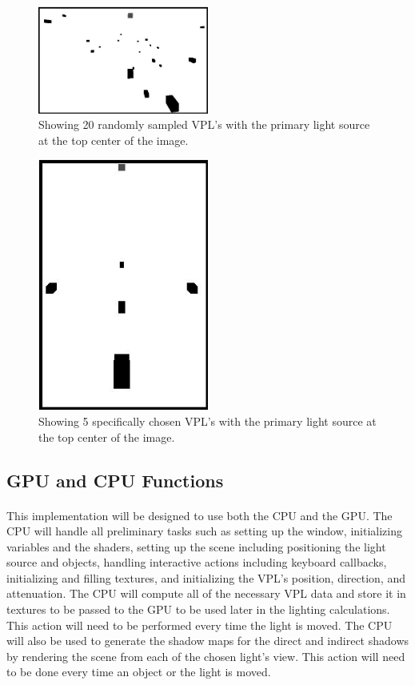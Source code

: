 \begin{figure}[h!]
  \centering
    \includegraphics[width=0.5\textwidth]{20randomVPLs.jpg}
  	\caption{Showing 20 randomly sampled VPL's with the primary light source at the top center of the image.}
	\label{fig:20randomVPLs}
\end{figure}

\begin{figure}[h!]
  \centering
    \includegraphics[width=0.5\textwidth]{5specificVPLs.jpg}
  	\caption{Showing 5 specifically chosen VPL's with the primary light source at the top center of the image.}
	\label{fig:5specificVPLs}
\end{figure}

\subsection{GPU and CPU Functions}
\paragraph{}
This implementation will be designed to use both the CPU and the GPU.  The CPU will handle all preliminary tasks such as setting up the window, initializing variables and the shaders, setting up the scene including positioning the light source and objects, handling interactive actions including keyboard callbacks, initializing and filling textures, and initializing the VPL's position, direction, and attenuation.  The CPU will compute all of the necessary VPL data and store it in textures to be passed to the GPU to be used later in the lighting calculations.  This action will need to be performed every time the light is moved.  The CPU will also be used to generate the shadow maps for the direct and indirect shadows by rendering the scene from each of the chosen light's view.  This action will need to be done every time an object or the light is moved.

